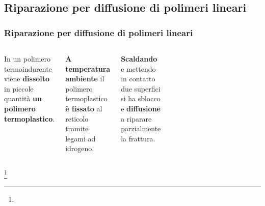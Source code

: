 \subsection{Riparazione per diffusione di polimeri lineari}
\begin{frame}\frametitle{Riparazione per diffusione di polimeri lineari}

\begin{columns}
 In un polimero termoindurente viene \textbf{dissolto} in piccole quantità \textbf{un polimero termoplastico}.

\textbf{A temperatura ambiente} il polimero termoplastico \textbf{è fissato} al reticolo tramite legami ad idrogeno.

\textbf{Scaldando} e mettendo in contatto due superfici si ha sblocco e \textbf{diffusione} a riparare parzialmente la frattura.


\vspace{-13pt}
\begin{figure}{}\end{figure}
\vspace{-20pt}
\begin{figure}{}\end{figure}

\end{columns}
\footnote{\tiny  {}}
\end{frame}
